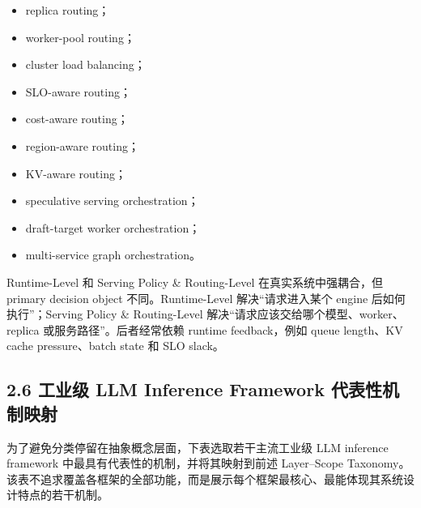 \documentclass[a4paper,10pt]{ctexart}
\begin{document}
\begin{itemize}
\item replica routing；

\item worker-pool routing；

\item cluster load balancing；

\item SLO-aware routing；

\item cost-aware routing；

\item region-aware routing；

\item KV-aware routing；

\item speculative serving orchestration；

\item draft-target worker orchestration；

\item multi-service graph orchestration。

\end{itemize}
Runtime-Level 和 Serving Policy \& Routing-Level 在真实系统中强耦合，但 primary decision object 不同。Runtime-Level 解决“请求进入某个 engine 后如何执行”；Serving Policy \& Routing-Level 解决“请求应该交给哪个模型、worker、replica 或服务路径”。后者经常依赖 runtime feedback，例如 queue length、KV cache pressure、batch state 和 SLO slack。




\subsection*{2.6 工业级 LLM Inference Framework 代表性机制映射}

为了避免分类停留在抽象概念层面，下表选取若干主流工业级 LLM inference framework 中最具有代表性的机制，并将其映射到前述 Layer–Scope Taxonomy。该表不追求覆盖各框架的全部功能，而是展示每个框架最核心、最能体现其系统设计特点的若干机制。
\end{document}
